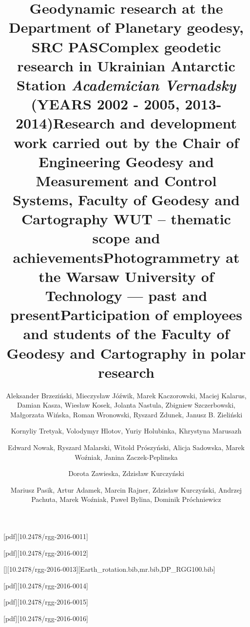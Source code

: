 \documentclass
[
  volume = 100,
  number = 1,
  year   = 2016,
]
{rgg}
\begin{document}
    \title{Geodynamic research at the Department of Planetary geodesy, SRC PAS}
    \author
    [Brzeziński, A.~et al.]
    {Aleksander Brzeziński, Mieczysław Jóźwik, Marek Kaczorowski,
      Maciej Kalarus, Damian Kasza, Wiesław Kosek, Jolanta Nastula,
      Zbigniew Szczerbowski, Małgorzata Wińska, Roman Wronowski,
      Ryszard Zdunek, Janusz B. Zieliński}
    [pdf][10.2478/rgg-2016-0011]

    \title
    [Complex geodetic research in\ldots\emph{Academician Vernadsky}]
    {Complex geodetic research in Ukrainian Antarctic Station \emph{Academician Vernadsky} (YEARS 2002 - 2005, 2013-2014)}
    \author[Tretyak, K.~et al.]{Kornyliy Tretyak, Volodymyr Hlotov, Yuriy Holubinka, Khrystyna Marusazh}
    [pdf][10.2478/rgg-2016-0012]

    [][10.2478/rgg-2016-0013][Earth_rotation.bib,mr.bib,DP_RGG100.bib]

    \title
    [Research and development work\ldots]
    {Research and development work carried out by the Chair of Engineering 
      Geodesy and Measurement and Control Systems, Faculty of Geodesy and 
      Cartography WUT – thematic scope and achievements}
    \author[Nowak, E.~et al.]{
      Edward Nowak, Ryszard Malarski, Witold Prószyński,
      Alicja Sadowska, Marek Woźniak, Janina Zaczek-Peplinska}
    [pdf][10.2478/rgg-2016-0014]

    \title
    [Photogrammetry at the WUT --- past and present]
    {Photogrammetry at the Warsaw University of Technology --- past and present}
    \author[Zawieska, D., Kurczyński, Z.]{Dorota Zawieska, Zdzisław Kurczyński}
    [pdf][10.2478/rgg-2016-0015]

    \title
    [Participation of employees and students\ldots in polar research]
    {Participation of employees and students of the Faculty of Geodesy and Cartography in polar research}
    \author
    [Pasik, M.~et al.]
    {%
      Mariusz Pasik, Artur Adamek, Marcin Rajner, Zdzisław Kurczyński,
      Andrzej Pachuta, Marek Woźniak, Paweł Bylina, Dominik Próchniewicz
    }
    [pdf][10.2478/rgg-2016-0016]
\end{document}
